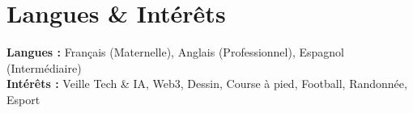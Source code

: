 \section{Langues \& Intérêts}
  \small{
    \textbf{Langues : } Français (Maternelle), Anglais (Professionnel), Espagnol (Intermédiaire) \\
    \textbf{Intérêts : } Veille Tech \& IA, Web3, Dessin, Course à pied, Football, Randonnée, Esport
}
